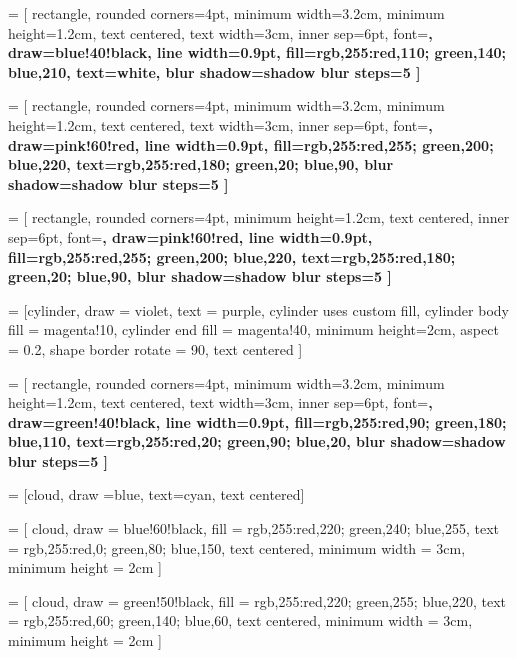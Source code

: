

 = [
    rectangle,
    rounded corners=4pt,
    minimum width=3.2cm,
    minimum height=1.2cm,
    text centered,
    text width=3cm,
    inner sep=6pt,
    font=\bfseries\small,
    draw=blue!40!black,
    line width=0.9pt,
    fill={rgb,255:red,110; green,140; blue,210},
    text=white,
    blur shadow={shadow blur steps=5}
]

 = [
    rectangle,
    rounded corners=4pt,
    minimum width=3.2cm,
    minimum height=1.2cm,
    text centered,
    text width=3cm,
    inner sep=6pt,
    font=\bfseries\small,
    draw=pink!60!red,
    line width=0.9pt,
    fill={rgb,255:red,255; green,200; blue,220}, %
    text={rgb,255:red,180; green,20; blue,90},   %
    blur shadow={shadow blur steps=5}
]

 = [
    rectangle,
    rounded corners=4pt,
    minimum height=1.2cm,
    text centered,
    inner sep=6pt,
    font=\bfseries\small,
    draw=pink!60!red,
    line width=0.9pt,
    fill={rgb,255:red,255; green,200; blue,220}, %
    text={rgb,255:red,180; green,20; blue,90},   %
    blur shadow={shadow blur steps=5}
]

 = [cylinder, 
    draw = violet, 
    text = purple,
    cylinder uses custom fill, 
    cylinder body fill = magenta!10, 
    cylinder end fill = magenta!40,
    minimum height=2cm,
    aspect = 0.2, 
    shape border rotate = 90, 
    text centered
]

 = [
    rectangle,
    rounded corners=4pt,
    minimum width=3.2cm,
    minimum height=1.2cm,
    text centered,
    text width=3cm,
    inner sep=6pt,
    font=\bfseries\small,
    draw=green!40!black,
    line width=0.9pt,
    fill={rgb,255:red,90; green,180; blue,110},
    text={rgb,255:red,20; green,90; blue,20},
    blur shadow={shadow blur steps=5}
]

 = [cloud,
	draw =blue,
	text=cyan,
    text centered]

 = [
    cloud,
    draw = blue!60!black,
    fill = {rgb,255:red,220; green,240; blue,255}, %
    text = {rgb,255:red,0; green,80; blue,150},    %
    text centered,
    minimum width = 3cm,
    minimum height = 2cm
]

 = [
    cloud,
    draw = green!50!black,
    fill = {rgb,255:red,220; green,255; blue,220},   %
    text = {rgb,255:red,60; green,140; blue,60},     %
    text centered,
    minimum width = 3cm,
    minimum height = 2cm
]


